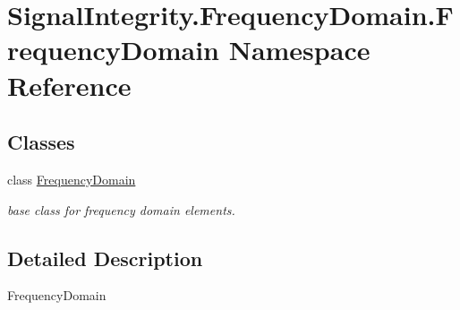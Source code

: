 \hypertarget{namespaceSignalIntegrity_1_1FrequencyDomain_1_1FrequencyDomain}{}\section{Signal\+Integrity.\+Frequency\+Domain.\+Frequency\+Domain Namespace Reference}
\label{namespaceSignalIntegrity_1_1FrequencyDomain_1_1FrequencyDomain}
\subsection*{Classes}
\begin{DoxyCompactItemize}
\item 
class \hyperlink{classSignalIntegrity_1_1FrequencyDomain_1_1FrequencyDomain_1_1FrequencyDomain}{Frequency\+Domain}
\begin{DoxyCompactList}\small\item\em base class for frequency domain elements. \end{DoxyCompactList}\end{DoxyCompactItemize}


\subsection{Detailed Description}
\begin{DoxyVerb}FrequencyDomain\end{DoxyVerb}
 